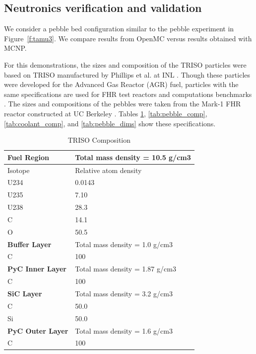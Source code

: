 \subsection{Neutronics verification and validation}

We consider a pebble bed configuration similar to the pebble experiment in Figure~\ref{f:tamu3}.
We compare results from OpenMC versus results obtained with MCNP.

For this demonstrations, the sizes and composition of the TRISO particles were based on TRISO
manufactured by Phillips et al. at INL \cite{phillips2010}.  Though these particles were developed
for the Advanced Gas Reactor (AGR) fuel, particles with the same specifications are used for FHR
test reactors and computations benchmarks \cite{charalampos2014}.  The sizes and compositions of
the pebbles were taken from the Mark-1 FHR reactor constructed at UC Berkeley
\cite{charalampos2014}.  Tables \ref{tab:triso_comp}, \ref{tab:pebble_comp},
\ref{tab:coolant_comp}, and \ref{tab:pebble_dims} show these specifications.

\begin{table}
  \centering
  \begin{tabular}{|ll|}
    \hline \hline
    \textbf{Fuel Region}	 & Total mass density = 10.5 g/cm3 \\
    \hline
    Isotope	     & Relative atom density \\
    U234	       & 0.0143 \\
    U235	       & 7.10 \\
    U238	       & 28.3 \\
    C	           & 14.1 \\
    O	           & 50.5 \\
    \hline \hline
    \textbf{Buffer Layer} & Total mass density = 1.0 g/cm3 \\
    \hline
    C	           & 100 \\
    \hline \hline
    \textbf{PyC Inner Layer}	   & Total mass density = 1.87 g/cm3 \\
    \hline
    C	           & 100 \\
    \hline \hline
    \textbf{SiC Layer}	   & Total mass density = 3.2 g/cm3 \\
    \hline
    C	           & 50.0 \\
    Si	         & 50.0 \\
    \hline \hline
    \textbf{PyC Outer Layer}	     & Total mass density = 1.6 g/cm3 \\
    \hline
    C	           & 100 \\
    \hline \hline
  \end{tabular}
  \caption{TRISO Composition}
  \label{tab:triso_comp}
\end{table}


